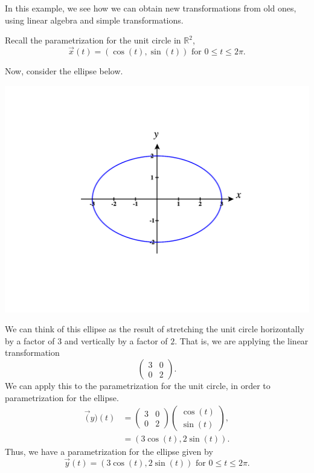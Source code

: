 \documentclass{ximera}
\begin{document}
\begin{example}
In this example, we see how we can obtain new transformations from old ones, using linear algebra and simple transformations.

Recall the parametrization for the unit circle in $\mathbb{R}^2$,
\[
\vec{x}(t) = (\cos(t), \sin(t))\textrm{ for }0\leq t\leq 2\pi.
\]

Now, consider the ellipse below.

\begin{image}
\includegraphics[width=\textwidth]{CalcPlot3D-ellipse}
\end{image}

We can think of this ellipse as the result of stretching the unit circle horizontally by a factor of $3$ and vertically by a factor of $2$. That is, we are applying the linear transformation
\[
\left(\begin{array}{cc}
3 & 0\\
0 & 2
\end{array}\right).
\]
We can apply this to the parametrization for the unit circle, in order to parametrization for the ellipse.
\begin{align*}
\vec(y)(t) &= \left(\begin{array}{cc}
3 & 0\\
0 & 2
\end{array}\right)\left(\begin{array}{c}\cos(t)\\\sin(t)\end{array}\right),\\
&= (3\cos(t), 2\sin(t)).
\end{align*}
Thus, we have a parametrization for the ellipse given by
\[
\vec{y}(t) = (3\cos(t), 2\sin(t))\textrm{ for }0\leq t\leq 2\pi.
\]


\end{example}
\end{document}
